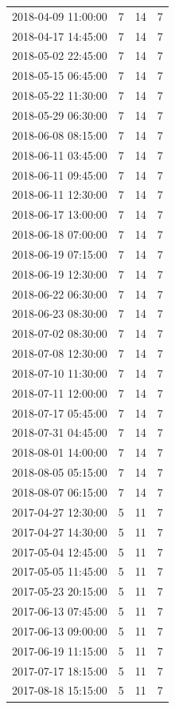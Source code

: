 \begin{tabular}{lrrr}
2018-04-09 11:00:00 & 7 & 14 & 7 \\
2018-04-17 14:45:00 & 7 & 14 & 7 \\
2018-05-02 22:45:00 & 7 & 14 & 7 \\
2018-05-15 06:45:00 & 7 & 14 & 7 \\
2018-05-22 11:30:00 & 7 & 14 & 7 \\
2018-05-29 06:30:00 & 7 & 14 & 7 \\
2018-06-08 08:15:00 & 7 & 14 & 7 \\
2018-06-11 03:45:00 & 7 & 14 & 7 \\
2018-06-11 09:45:00 & 7 & 14 & 7 \\
2018-06-11 12:30:00 & 7 & 14 & 7 \\
2018-06-17 13:00:00 & 7 & 14 & 7 \\
2018-06-18 07:00:00 & 7 & 14 & 7 \\
2018-06-19 07:15:00 & 7 & 14 & 7 \\
2018-06-19 12:30:00 & 7 & 14 & 7 \\
2018-06-22 06:30:00 & 7 & 14 & 7 \\
2018-06-23 08:30:00 & 7 & 14 & 7 \\
2018-07-02 08:30:00 & 7 & 14 & 7 \\
2018-07-08 12:30:00 & 7 & 14 & 7 \\
2018-07-10 11:30:00 & 7 & 14 & 7 \\
2018-07-11 12:00:00 & 7 & 14 & 7 \\
2018-07-17 05:45:00 & 7 & 14 & 7 \\
2018-07-31 04:45:00 & 7 & 14 & 7 \\
2018-08-01 14:00:00 & 7 & 14 & 7 \\
2018-08-05 05:15:00 & 7 & 14 & 7 \\
2018-08-07 06:15:00 & 7 & 14 & 7 \\
2017-04-27 12:30:00 & 5 & 11 & 7 \\
2017-04-27 14:30:00 & 5 & 11 & 7 \\
2017-05-04 12:45:00 & 5 & 11 & 7 \\
2017-05-05 11:45:00 & 5 & 11 & 7 \\
2017-05-23 20:15:00 & 5 & 11 & 7 \\
2017-06-13 07:45:00 & 5 & 11 & 7 \\
2017-06-13 09:00:00 & 5 & 11 & 7 \\
2017-06-19 11:15:00 & 5 & 11 & 7 \\
2017-07-17 18:15:00 & 5 & 11 & 7 \\
2017-08-18 15:15:00 & 5 & 11 & 7 \\

\end{tabular}

